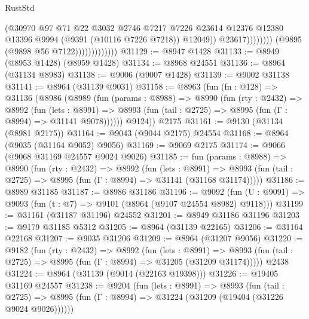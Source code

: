 \begin{lexlean}{RustStd}
\begin{coremodule}
                                            (@30970
                                              @97
                                              @71
                                              @22
                                              @3032
                                              @2746
                                              @7217
                                              @7226
                                              @23614
                                              @12376
                                              @12380
                                              @13396
                                              @9994
                                              (@9391 (@10116 @7226 @7218))
                                              @12049))
                                          @23617))))))))
                          (@9895 (@9898 @56 @7122)))))))))))))
@31129 := @8947 @1428
@31133 := @8949 (@8953 @1428) (@8959 @1428)
@31134 := @8968 @24551
@31136 := @8964 (@31134 @8983)
@31138 := @9006 (@9007 @1428)
@31139 := @9002 @31138
@31141 := @8964 (@31139 @9031)
@31158 := @8963
    (fun (fn : @128) =>
    @31136
      (@8986
        (@8989
          (fun (params : @8988) =>
          @8990
            (fun (rty : @2432) =>
            @8992
              (fun (lets : @8991) =>
              @8993 (fun (tail : @2725) => @8995 (fun (Γ : @8994) => @31141 @9078))))))
        @9124))
    @2175
@31161 := @9130 (@31134 (@8981 @2175))
@31164 := @9043 (@9044 @2175) @24554
@31168 := @8964 (@9035 (@31164 @9052) @9056)
@31169 := @9069 @2175
@31174 := @9066 (@9068 @31169 @24557 @9024 @9026)
@31185 := fun (params : @8988) =>
  @8990
    (fun (rty : @2432) =>
    @8992
      (fun (lets : @8991) =>
      @8993 (fun (tail : @2725) => @8995 (fun (Γ : @8994) => @31141 (@31168 @31174)))))
@31186 := @8989 @31185
@31187 := @8986 @31186
@31196 := @9092
    (fun (U : @9091) => @9093 (fun (t : @7) => @9101 (@8964 (@9107 @24554 @8982) @9118)))
@31199 := @31161 (@31187 @31196) @24552
@31201 := @8949 @31186 @31196
@31203 := @9179 @31185 @5312
@31205 := @8964 (@31139 @22165)
@31206 := @31164 @22168
@31207 := @9035 @31206
@31209 := @8964 (@31207 @9056)
@31220 := @9182
    (fun (rty : @2432) =>
    @8992
      (fun (lets : @8991) =>
      @8993 (fun (tail : @2725) => @8995 (fun (Γ : @8994) => @31205 (@31209 @31174)))))
    @2438
@31224 := @8964 (@31139 (@9014 (@22163 @19398)))
@31226 := @19405 @31169 @24557
@31238 := @9204
    (fun (lets : @8991) =>
    @8993
      (fun (tail : @2725) =>
      @8995 (fun (Γ : @8994) => @31224 (@31209 (@19404 (@31226 @9024 @9026))))))

\end{coremodule}
\end{lexlean}
